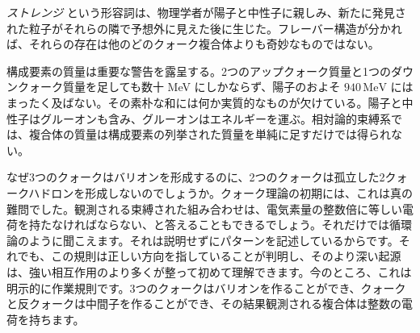 \emph{ストレンジ} という形容詞は、物理学者が陽子と中性子に親しみ、新たに発見された粒子がそれらの隣で予想外に見えた後に生じた。フレーバー構造が分かれば、それらの存在は他のどのクォーク複合体よりも奇妙なものではない。

構成要素の質量は重要な警告を露呈する。2つのアップクォーク質量と1つのダウンクォーク質量を足しても数十 MeV にしかならず、陽子のおよそ \(940\,\mathrm{MeV}\) にはまったく及ばない。その素朴な和には何か実質的なものが欠けている。陽子と中性子はグルーオンも含み、グルーオンはエネルギーを運ぶ。相対論的束縛系では、複合体の質量は構成要素の列挙された質量を単純に足すだけでは得られない。

\begin{classroomqa}
\end{classroomqa}

\begin{classroomqa}
\end{classroomqa}

\begin{classroomqa}
\end{classroomqa}

\begin{classroomqa}
\end{classroomqa}

なぜ3つのクォークはバリオンを形成するのに、2つのクォークは孤立した2クォークハドロンを形成しないのでしょうか。クォーク理論の初期には、これは真の難問でした。観測される束縛された組み合わせは、電気素量の整数倍に等しい電荷を持たなければならない、と答えることもできるでしょう。それだけでは循環論のように聞こえます。それは説明せずにパターンを記述しているからです。それでも、この規則は正しい方向を指していることが判明し、そのより深い起源は、強い相互作用のより多くが整って初めて理解できます。今のところ、これは明示的に作業規則です。3つのクォークはバリオンを作ることができ、クォークと反クォークは中間子を作ることができ、その結果観測される複合体は整数の電荷を持ちます。

